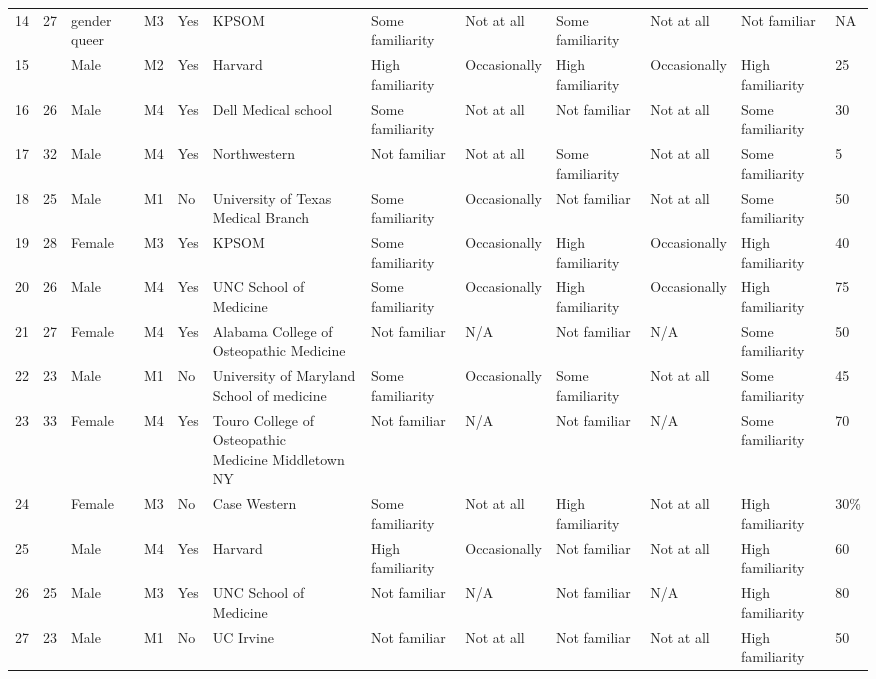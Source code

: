 \documentclass[11pt]{article}
\begin{document}
\begin{landscape}
{\begin{longtable}{rlllllllllll}
14 & 27 & gender queer & M3 & Yes & KPSOM & Some familiarity & Not at all & Some familiarity & Not at all & Not familiar & NA \\
15 & \multicolumn{1}{l}{} & Male & M2 & Yes & Harvard & High familiarity & Occasionally & High familiarity & Occasionally & High familiarity & 25 \\
16 & 26 & Male & M4 & Yes & Dell Medical school & Some familiarity & Not at all & Not familiar & Not at all & Some familiarity & 30 \\
17 & 32 & Male & M4 & Yes & Northwestern & Not familiar & Not at all & Some familiarity & Not at all & Some familiarity & 5 \\
18 & 25 & Male & M1 & No & University of Texas Medical Branch & Some familiarity & Occasionally & Not familiar & Not at all & Some familiarity & 50 \\
19 & 28 & Female & M3 & Yes & KPSOM & Some familiarity & Occasionally & High familiarity & Occasionally & High familiarity & 40 \\
20 & 26 & Male & M4 & Yes & UNC School of Medicine & Some familiarity & Occasionally & High familiarity & Occasionally & High familiarity & 75 \\
21 & 27 & Female & M4 & Yes & \makecell[l]{Alabama College of\\ Osteopathic Medicine} & Not familiar & N/A & Not familiar & N/A & Some familiarity & 50 \\
22 & 23 & Male & M1 & No & \makecell[l]{University of Maryland \\School of medicine} & Some familiarity & Occasionally & Some familiarity & Not at all & Some familiarity & 45 \\
23 & 33 & Female & M4 & Yes & \makecell[l]{Touro College of Osteopathic\\ Medicine Middletown NY} & Not familiar & N/A & Not familiar & N/A & Some familiarity & 70 \\
24 & \multicolumn{1}{l}{} & Female & M3 & No & Case Western & Some familiarity & Not at all & High familiarity & Not at all & High familiarity & 30\% \\
25 & \multicolumn{1}{l}{} & Male & M4 & Yes & Harvard & High familiarity & Occasionally & Not familiar & Not at all & High familiarity & 60 \\
26 & 25 & Male & M3 & Yes & UNC School of Medicine & Not familiar & N/A & Not familiar & N/A & High familiarity & 80 \\
27 & 23 & Male & M1 & No & UC Irvine & Not familiar & Not at all & Not familiar & Not at all & High familiarity & 50 \\

\end{longtable}}
\end{landscape}
\end{document}
